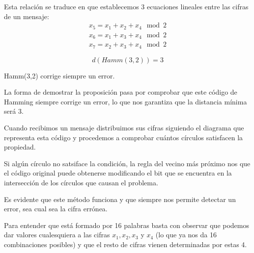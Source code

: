 Esta relación se traduce en que establecemos 3 ecuaciones lineales entre las cifras de un mensaje:
\[\begin{array}{l}x_5=x_1+x_2+x_4 \mod 2 \\ x_6=x_1+x_3+x_4 \mod 2 \\ x_7=x_2+x_3+x_4 \mod 2 \end{array}\]

\begin{prop}
\[d(Hamm(3,2))=3\]
\end{prop}
\begin{corol}
Hamm(3,2) corrige siempre un error.
\end{corol}

La forma de demostrar la proposición pasa por comprobar que este código de Hamming siempre corrige un error, lo que nos garantiza que la distancia mínima será 3.

Cuando recibimos un mensaje distribuimos sus cifras siguiendo el diagrama que representa esta código y procedemos a comprobar cuántos círculos satisfacen la propiedad.

Si algún círculo no satsiface la condición, la regla del vecino más próximo nos que el código original puede obtenerse modificando el bit que se encuentra en la intersección de los círculos que causan el problema.

Es evidente que este método funciona y que siempre nos permite detectar un error, sea cual sea la cifra errónea.

Para entender que está formado por 16 palabras basta con observar que podemos dar valores cualesquiera a las cifras $x_1,x_2,x_3$ y $x_4$ (lo que ya nos da 16 combinaciones posibles) y que el resto de cifras vienen determinadas por estas 4.